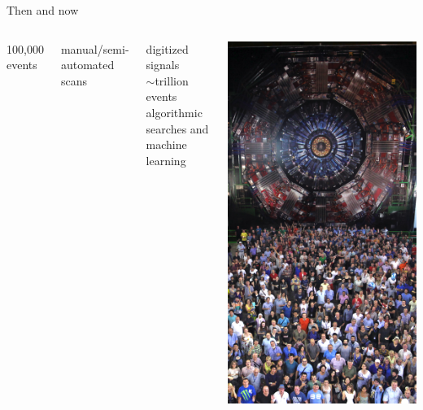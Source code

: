 \documentclass[aspectratio=169]{beamer}
\begin{document}
\begin{frame}{Then and now}
\begin{columns}
\begin{center}
\begin{columns}
\vspace{0.5 cm}
100,000 events

\vspace{0.5 cm}
manual/semi-automated scans

\centering
digitized signals \\

\vspace{0.5 cm}
$\sim$trillion events \\

\vspace{0.5 cm}
algorithmic searches and machine learning
\end{columns}
\end{center}

\includegraphics[width=\linewidth]{cms25_2.jpg}
\end{columns}
\end{frame}
\end{document}
